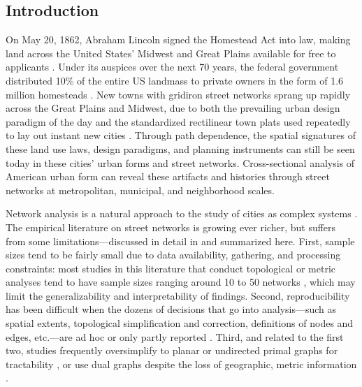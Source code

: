 \documentclass[11pt]{article}
\begin{document}
\begin{multicols}{2}

\section{Introduction}

On May 20, 1862, Abraham Lincoln signed the Homestead Act into law, making land across the United States' Midwest and Great Plains available for free to applicants \citep{porterfield_homestead_2005}. Under its auspices over the next 70 years, the federal government distributed 10\% of the entire US landmass to private owners in the form of 1.6 million homesteads \citep{lee_kansas_1979, sherraden_inclusion_2005}. New towns with gridiron street networks sprang up rapidly across the Great Plains and Midwest, due to both the prevailing urban design paradigm of the day and the standardized rectilinear town plats used repeatedly to lay out instant new cities \citep{southworth_streets_1997}. Through path dependence, the spatial signatures of these land use laws, design paradigms, and planning instruments can still be seen today in these cities' urban forms and street networks. Cross-sectional analysis of American urban form can reveal these artifacts and histories through street networks at metropolitan, municipal, and neighborhood scales.

Network analysis is a natural approach to the study of cities as complex systems \citep{masucci_random_2009}. The empirical literature on street networks is growing ever richer, but suffers from some limitations---discussed in detail in \citep{boeing_osmnx:_2017} and summarized here. First, sample sizes tend to be fairly small due to data availability, gathering, and processing constraints: most studies in this literature that conduct topological or metric analyses tend to have sample sizes ranging around 10 to 50 networks \citep{buhl_topological_2006, cardillo_structural_2006, barthelemy_modeling_2008, strano_urban_2013}, which may limit the generalizability and interpretability of findings. Second, reproducibility has been difficult when the dozens of decisions that go into analysis---such as spatial extents, topological simplification and correction, definitions of nodes and edges, etc.---are ad hoc or only partly reported \citep[e.g.,][]{porta_network_2006, strano_urban_2013}. Third, and related to the first two, studies frequently oversimplify to planar or undirected primal graphs for tractability \citep[e.g.,][]{buhl_topological_2006, cardillo_structural_2006, barthelemy_modeling_2008, masucci_random_2009}, or use dual graphs despite the loss of geographic, metric information \citep{batty_network_2005, jiang_integration_2002, ratti_space_2004, crucitti_centrality_2006, crucitti_centrality_2006-1}. 


\end{multicols}
\end{document}
